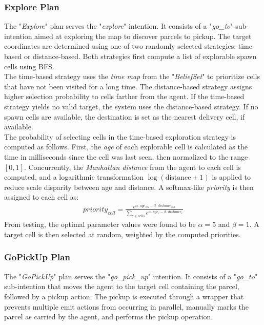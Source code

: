         \subsubsection{Explore Plan}
            The "\textit{Explore}" plan serves the "\textit{explore}" intention. It consists of a "\textit{go\_to}" sub-intention aimed at exploring the map to discover parcels to pickup. The target coordinates are determined using one of two randomly selected strategies: time-based or distance-based. Both strategies first compute a list of explorable spawn cells using BFS.
            \medskip\\
            The time-based strategy uses the \textit{time map} from the "\textit{BeliefSet}" to prioritize cells that have not been visited for a long time. The distance-based strategy assigns higher selection probability to cells farther from the agent. If the time-based strategy yields no valid target, the system uses the distance-based strategy. If no spawn cells are available, the destination is set as the nearest delivery cell, if available.
            \medskip\\
            The probability of selecting cells in the time-based exploration strategy is computed as follows. First, the \textit{age} of each explorable cell is calculated as the time in milliseconds since the cell was last seen, then normalized to the range $[0, 1]$. Concurrently, the \textit{Manhattan distance} from the agent to each cell is computed, and a logarithmic transformation $\log(\text{distance} + 1)$ is applied to reduce scale disparity between age and distance. A softmax-like \textit{priority} is then assigned to each cell as:
            \begin{gather*}
                priority_{cell} = \frac{e^{\alpha \cdot age_{cell} - \beta \cdot distance_{cell}}}{\sum_{c \in cells}e^{\alpha \cdot age_c - \beta \cdot distance_c}}
            \end{gather*}
            From testing, the optimal parameter values were found to be $\alpha = 5$ and $\beta = 1$. A target cell is then selected at random, weighted by the computed priorities.

        \subsubsection{GoPickUp Plan}
            The "\textit{GoPickUp}" plan serves the "\textit{go\_pick\_up}" intention. It consists of a "\textit{go\_to}" sub-intention that moves the agent to the target cell containing the parcel, followed by a pickup action. The pickup is executed through a wrapper that prevents multiple emit actions from occurring in parallel, manually marks the parcel as carried by the agent, and performs the pickup operation.

